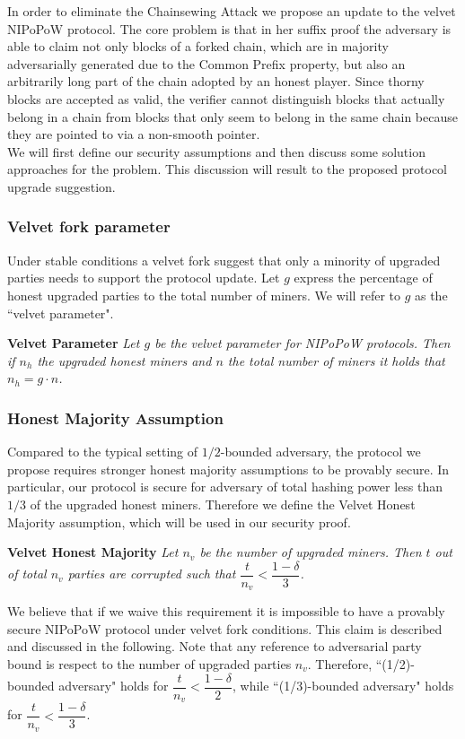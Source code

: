 In order to eliminate the Chainsewing Attack we propose an update to the velvet
NIPoPoW protocol. The core problem is that in her suffix proof the adversary
is able to claim not only blocks of a forked chain,  which are in majority adversarially
generated due to the Common Prefix property, but also an arbitrarily long part of the
chain adopted by an honest player. Since thorny blocks are accepted as valid,
the verifier cannot distinguish blocks that actually belong in a chain from
blocks that only seem to belong in the same chain because they are pointed to
via a non-smooth pointer. \\

We will first define our security assumptions and then discuss some solution
approaches for the problem. This discussion will result to the proposed protocol
upgrade suggestion.

\subsubsection{Velvet fork parameter}
Under stable conditions a velvet fork suggest that only a minority of upgraded parties needs to support the protocol update. Let $g$ express the percentage of honest upgraded parties to the total number of miners. We will refer to $g$ as the ``velvet parameter".

\begin{defn}{\textbf{Velvet Parameter}}
	\textit{Let $g$ be the velvet parameter for NIPoPoW protocols.  Then if $n_h$ the upgraded honest miners and $n$ the total number of miners it holds that $n_h = g \cdot n$.}
	\label{defn:velvet_honest_majority}
\end{defn}

\subsubsection{Honest Majority Assumption}
Compared to the typical setting of $1/2$-bounded adversary, the protocol we
propose requires stronger honest majority assumptions to be provably secure. 
In particular, our protocol is secure for adversary of total hashing power 
less than $1/3$ of the upgraded honest miners. Therefore we define the Velvet
Honest Majority assumption, which will be used in our security proof.

\begin{defn}{\textbf{Velvet Honest Majority}}
	\textit{Let $n_v$ be the number of upgraded miners. Then $t$ out of total $n_v$
	parties are corrupted such that $\dfrac{t}{n_v} < \dfrac{1 - \delta}{3} $. }
	\label{defn:velvet_honest_majority}
\end{defn}
We believe that if we waive this requirement it is impossible to have a provably 
secure NIPoPoW protocol under velvet fork conditions.
This claim is described and discussed in the following.
Note that any reference to adversarial party bound is respect to the number of
upgraded parties $n_v$. Therefore, ``(1/2)-bounded adversary" holds for
$\dfrac{t}{n_v} < \dfrac{1 - \delta}{2} $, while ``(1/3)-bounded adversary" holds for
$\dfrac{t}{n_v} < \dfrac{1 - \delta}{3} $.

